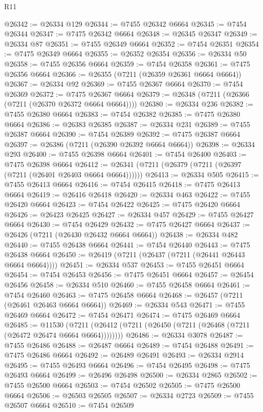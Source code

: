 \begin{lexlean}{R11}
\begin{coremodule}
@26342 := @26334 @129
@26344 := @7455 @26342 @6664
@26345 := @7454 @26344
@26347 := @7475 @26342 @6664
@26348 := @26345 @26347
@26349 := @26334 @87
@26351 := @7455 @26349 @6664
@26352 := @7454 @26351
@26354 := @7475 @26349 @6664
@26355 := @26352 @26354
@26356 := @26334 @50
@26358 := @7455 @26356 @6664
@26359 := @7454 @26358
@26361 := @7475 @26356 @6664
@26366 := @26355 (@7211 (@26359 @26361 @6664 @6664))
@26367 := @26334 @92
@26369 := @7455 @26367 @6664
@26370 := @7454 @26369
@26372 := @7475 @26367 @6664
@26379 := @26348 (@7211 (@26366 (@7211 (@26370 @26372 @6664 @6664))))
@26380 := @26334 @236
@26382 := @7455 @26380 @6664
@26383 := @7454 @26382
@26385 := @7475 @26380 @6664
@26386 := @26383 @26385
@26387 := @26334 @231
@26389 := @7455 @26387 @6664
@26390 := @7454 @26389
@26392 := @7475 @26387 @6664
@26397 := @26386 (@7211 (@26390 @26392 @6664 @6664))
@26398 := @26334 @293
@26400 := @7455 @26398 @6664
@26401 := @7454 @26400
@26403 := @7475 @26398 @6664
@26412 := @26341 (@7211 (@26379 (@7211 (@26397 (@7211 (@26401 @26403 @6664 @6664))))))
@26413 := @26334 @505
@26415 := @7455 @26413 @6664
@26416 := @7454 @26415
@26418 := @7475 @26413 @6664
@26419 := @26416 @26418
@26420 := @26334 @463
@26422 := @7455 @26420 @6664
@26423 := @7454 @26422
@26425 := @7475 @26420 @6664
@26426 := @26423 @26425
@26427 := @26334 @457
@26429 := @7455 @26427 @6664
@26430 := @7454 @26429
@26432 := @7475 @26427 @6664
@26437 := @26426 (@7211 (@26430 @26432 @6664 @6664))
@26438 := @26334 @482
@26440 := @7455 @26438 @6664
@26441 := @7454 @26440
@26443 := @7475 @26438 @6664
@26450 := @26419 (@7211 (@26437 (@7211 (@26441 @26443 @6664 @6664))))
@26451 := @26334 @537
@26453 := @7455 @26451 @6664
@26454 := @7454 @26453
@26456 := @7475 @26451 @6664
@26457 := @26454 @26456
@26458 := @26334 @510
@26460 := @7455 @26458 @6664
@26461 := @7454 @26460
@26463 := @7475 @26458 @6664
@26468 := @26457 (@7211 (@26461 @26463 @6664 @6664))
@26469 := @26334 @543
@26471 := @7455 @26469 @6664
@26472 := @7454 @26471
@26474 := @7475 @26469 @6664
@26485 := @11530
    (@7211 (@26412 (@7211 (@26450 (@7211 (@26468 (@7211 (@26472 @26474 @6664 @6664))))))))
@26486 := @26334 @3078
@26487 := @7455 @26486
@26488 := @26487 @6664
@26489 := @7454 @26488
@26491 := @7475 @26486 @6664
@26492 := @26489 @26491
@26493 := @26334 @2914
@26495 := @7455 @26493 @6664
@26496 := @7454 @26495
@26498 := @7475 @26493 @6664
@26499 := @26496 @26498
@26500 := @26334 @2865
@26502 := @7455 @26500 @6664
@26503 := @7454 @26502
@26505 := @7475 @26500 @6664
@26506 := @26503 @26505
@26507 := @26334 @2723
@26509 := @7455 @26507 @6664
@26510 := @7454 @26509

\end{coremodule}
\end{lexlean}
